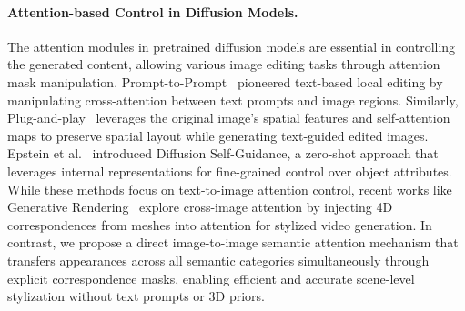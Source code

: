 \paragraph{\bf{Attention-based Control in Diffusion Models.}}
The attention modules in pretrained diffusion models are essential in controlling the generated content, allowing various image editing tasks through attention mask manipulation.
Prompt-to-Prompt~\cite{hertz2022p2p} pioneered text-based local editing by manipulating cross-attention between text prompts and image regions.
Similarly, Plug-and-play~\cite{tumanyan2023plugandplay} leverages the original image's spatial features and self-attention maps to preserve spatial layout while generating text-guided edited images.
Epstein et al.~\cite{epstein2023diffusionselfguidance} introduced Diffusion Self-Guidance, a zero-shot approach that leverages internal representations for fine-grained control over object attributes.
While these methods focus on text-to-image attention control, recent works like Generative Rendering~\cite{cai2023genren} explore cross-image attention by injecting 4D correspondences from meshes into attention for stylized video generation.
In contrast, we propose a direct image-to-image semantic attention mechanism that transfers appearances across all semantic categories simultaneously through explicit correspondence masks, enabling efficient and accurate scene-level stylization without text prompts or 3D priors.

